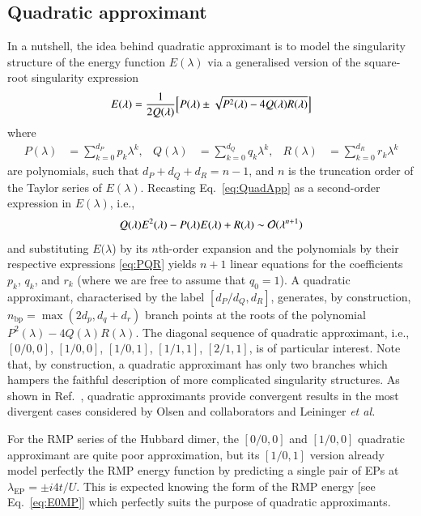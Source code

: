 \documentclass[aps,prb,reprint,noshowkeys,superscriptaddress]{revtex4-1}
\newcommand{\latin}[1]{#1}
\newcommand{\ie}{\latin{i.e.}}
\newcommand{\etal}{\textit{et al.}}
\begin{document}
\subsection{Quadratic approximant}
In a nutshell, the idea behind quadratic approximant is to model the singularity structure of the energy function $E(\lambda)$ via a generalised version of the square-root singularity expression \cite{Mayer_1985,Goodson_2011,Goodson_2019}
\begin{equation}
	\label{eq:QuadApp}
	E(\lambda) = \frac{1}{2 Q(\lambda)} \qty[ P(\lambda) \pm \sqrt{P^2(\lambda) - 4 Q(\lambda) R(\lambda)} ]
\end{equation}
where 
\begin{align}
	\label{eq:PQR}
	P(\lambda) & = \sum_{k=0}^{d_P} p_k \lambda^k,
	&
	Q(\lambda) & = \sum_{k=0}^{d_Q} q_k \lambda^k, 
	&
	R(\lambda) & = \sum_{k=0}^{d_R} r_k \lambda^k 
\end{align}
are polynomials, such that $d_P + d_Q + d_R = n - 1$, and $n$ is the truncation order of the Taylor series of $E(\lambda)$.
Recasting Eq.~\eqref{eq:QuadApp} as a second-order expression in $E(\lambda)$, \ie,
\begin{equation}
	Q(\lambda) E^2(\lambda) - P(\lambda) E(\lambda) + R(\lambda) \sim \order*{\lambda^{n+1}}
\end{equation}
and substituting $E(\lambda$) by its $n$th-order expansion and the polynomials by their respective expressions \eqref{eq:PQR} yields $n+1$ linear equations for the coefficients $p_k$, $q_k$, and $r_k$ (where we are free to assume that $q_0 = 1$).
A quadratic approximant, characterised by the label $[d_P/d_Q,d_R]$, generates, by construction, $n_\text{bp} = \max(2d_p,d_q+d_r)$ branch points at the roots of the polynomial $P^2(\lambda) - 4 Q(\lambda) R(\lambda)$.
The diagonal sequence of quadratic approximant, \ie, $[0/0,0]$, $[1/0,0]$, $[1/0,1]$, $[1/1,1]$, $[2/1,1]$, is of particular interest.
Note that, by construction, a quadratic approximant has only two branches which hampers the faithful description of more complicated singularity structures.
As shown in Ref.~, quadratic approximants provide convergent results in the most divergent cases considered by Olsen and collaborators \cite{Christiansen_1996,Olsen_1996} and Leininger \etal \cite{Leininger_2000}

For the RMP series of the Hubbard dimer, the $[0/0,0]$ and $[1/0,0]$ quadratic approximant are quite poor approximation, but its $[1/0,1]$ version already model perfectly the RMP energy function by predicting a single pair of EPs at $\lambda_\text{EP} = \pm i 4t/U$.
This is expected knowing the form of the RMP energy [see Eq.~\eqref{eq:E0MP}] which perfectly suits the purpose of quadratic approximants.
\end{document}
